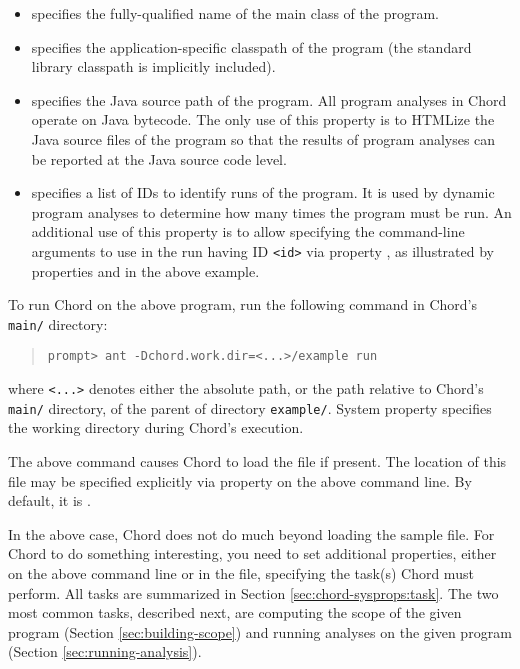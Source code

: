 \begin{itemize}
\item
{} specifies the fully-qualified name of the main class of the
program.
\item
{} specifies the application-specific classpath of the program
(the standard library classpath is implicitly included).
\item
{} specifies the Java source path of the program.
All program analyses in Chord operate on Java bytecode.
The only use of this property is to HTMLize the Java source files of the program so that the
results of program analyses can be reported at the Java source code level.
\item
{} specifies a list of IDs to identify runs of the program.
It is used by dynamic program analyses to determine how many times the program must be run.
An additional use of this property is to allow specifying the command-line arguments to use
in the run having ID {\tt <id>} via property , as illustrated by
properties  and  in the above example.
\end{itemize}

To run Chord on the above program, run the following command in Chord's {\tt main/} directory:

\begin{quote}
\begin{verbatim}
prompt> ant -Dchord.work.dir=<...>/example run
\end{verbatim}
\end{quote}

\noindent where {\tt <...>} denotes either the absolute path, or the path relative to Chord's {\tt main/} directory,
of the parent of directory {\tt example/}.
System property  specifies the working directory during Chord's execution.

The above command causes Chord to load the  file if present.
The location of this file may be specified explicitly via property
 on the above command line.
By default, it is .

In the above case, Chord does not do much beyond loading the sample  file.
For Chord to do something interesting, you need to set additional properties, either
on the above command line or in the  file, specifying the task(s)
Chord must perform.
All tasks are summarized in Section \ref{sec:chord-sysprops:task}.
The two most common tasks, described next, are computing the scope of the given program (Section \ref{sec:building-scope})
and running analyses on the given program (Section \ref{sec:running-analysis}).

